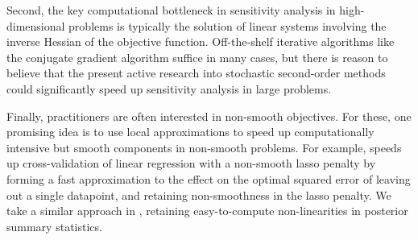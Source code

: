 Second, the key computational bottleneck in sensitivity analysis in
high-dimensional problems is typically the solution of linear systems involving
the inverse Hessian of the objective function. Off-the-shelf iterative
algorithms like the conjugate gradient algorithm %
suffice in many cases, but there is reason to believe that the present active
research into stochastic second-order methods
could significantly speed up sensitivity analysis in large problems.

Finally, practitioners are often interested in non-smooth objectives. For these,
one promising idea is to use local approximations to speed up computationally
intensive but smooth components in non-smooth problems. For example,
\citet{wilson:2020:approximatecv} speeds up cross-validation of linear
regression with a non-smooth lasso penalty by forming a fast approximation to
the effect on the optimal squared error of leaving out a single datapoint, and
retaining non-smoothness in the lasso penalty. We take a similar approach in
\citet{giordano:2021:bnpsensitivity}, retaining easy-to-compute non-linearities
in posterior summary statistics.

%


\newpage





